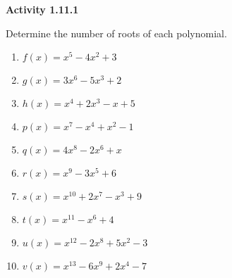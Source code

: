 \vspace{0.3ex}
\noindent\textbf{Activity 1.11.1}

\vspace{0.2ex}

Determine the number of roots of each polynomial.
\begin{multicols}{2}
\begin{enumerate}
    \item  \( f(x) = x^5 - 4x^2 + 3 \)
    \item  \( g(x) = 3x^6 - 5x^3 + 2 \)
    \item  \( h(x) = x^4 + 2x^3 - x + 5 \)
    \item  \( p(x) = x^7 - x^4 + x^2 - 1 \)
    \item  \( q(x) = 4x^8 - 2x^6 + x \)
    \item  \( r(x) = x^9 - 3x^5 + 6 \)
    \item  \( s(x) = x^{10} + 2x^7 - x^3 + 9 \)
    \item  \( t(x) = x^{11} - x^6 + 4 \)
    \item  \( u(x) = x^{12} - 2x^8 + 5x^2 - 3 \)
    \item  \( v(x) = x^{13} - 6x^9 + 2x^4 - 7 \)
\end{enumerate}
\end{multicols}
